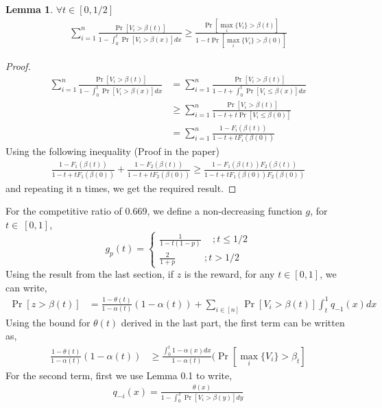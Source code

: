 \documentclass[10pt, letterpaper, twoside]{article}
\newtheorem{lemma}[theorem]{Lemma}
\begin{document}
	\begin{lemma}
		$\forall t \in [0,1/2]$
		\begin{align*}
		\sum_{i=1}^{n} \frac{\Pr[V_{i}>\beta(t)]}{1-\int_{0}^{t} \Pr[V_{i}>\beta(x)] dx} \geq \frac{\Pr[\max_{i} \{V_{i}\} > \beta(t)]}{1-t\Pr[\max_{i} \{V_{i}\} > \beta(0)]}
		\end{align*}
	\end{lemma}
	\begin{proof}
		\begin{align*}
		\sum_{i=1}^{n} \frac{\Pr[V_{i}>\beta(t)]}{1-\int_{0}^{t} \Pr[V_{i}>\beta(x)] dx} &= \sum_{i=1}^{n} \frac{\Pr[V_{i}>\beta(t)]}{1-t+\int_{0}^{t} \Pr[V_{i}\leq\beta(x)] dx}\\
		&\geq \sum_{i=1}^{n} \frac{\Pr[V_{i}>\beta(t)]}{1-t+t\Pr[V_{i}\leq\beta(0)]}\\
		&=\sum_{i=1}^{n} \frac{1-F_{i}(\beta(t))}{1-t+tF_{i}(\beta(0))}
		\end{align*}
		Using the following inequality	 (Proof in the paper)
		\begin{align*} 
		\frac{1-F_{1}(\beta(t))}{1-t+tF_{1}(\beta(0))} + \frac{1-F_{2}(\beta(t))}{1-t+tF_{2}(\beta(0))} \geq \frac{1-F_{1}(\beta(t))F_{2}(\beta(t))}{1-t+tF_{1}(\beta(0))F_{2}(\beta(0))} 
		\end{align*}  
		and repeating it n times, we get the required result.
	\end{proof}
	For the competitive ratio of 0.669, we define a non-decreasing function $g$, for $t \in\ [0,1]$,
	$$g_{p}(t) = \begin{cases}
	\frac{1}{1-t(1-p)}  \quad \,; t \leq 1/2 \\
	\frac{2}{1+p} \quad \quad \quad; t > 1/2
	\end{cases}
	$$
	Using the result from the last section, if $z$ is the reward, for any $t \in [0,1]$, we can write,\\
	\begin{align*}
	\Pr[z > \beta(t)] &= \frac{1-\theta(t)}{1-\alpha(t)} (1-\alpha(t)) + \sum_{i \in [n]} \Pr[V_{i} > \beta(t)] \int_{t}^{1} q_{-1}(x) dx
	\end{align*}
	Using the bound for $\theta(t)$ derived in the last part, the first term can be written as,
	\begin{align*}
	\frac{1-\theta(t)}{1-\alpha(t)} (1-\alpha(t)) &\geq \frac{\int_{0}^{t} 1 - \alpha(x) dx}{1-\alpha(t)} (\Pr[\max_{i} \{V_{i}\} > \beta_{t}]
	\end{align*}
	For the second term, first we use Lemma 0.1 to write,
	\begin{align*}
	q_{-i}(x) = \frac{\theta(x)}{1-\int_{0}^{x} \Pr[V_{i} > \beta(y)]  dy}
	\end{align*}
\end{document}
